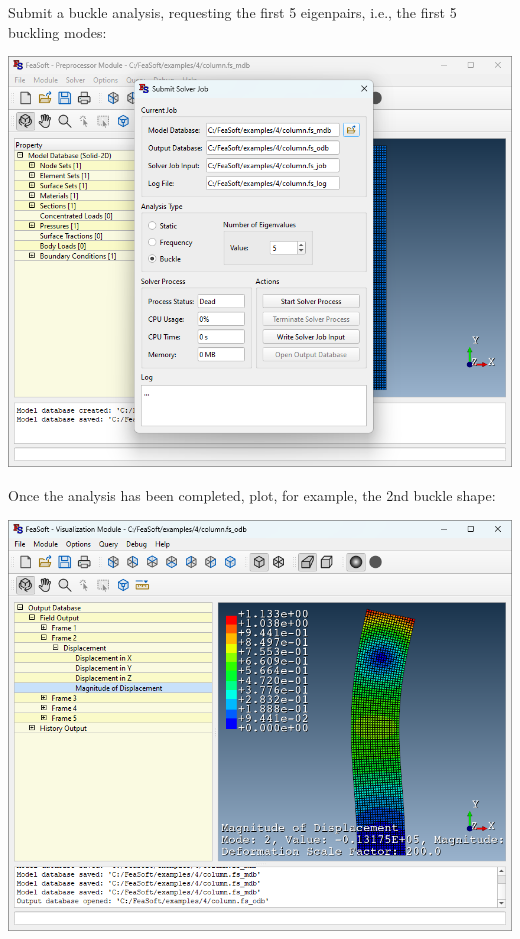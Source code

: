 \documentclass[
    11pt,        %
    a4paper,     %
    final,       %
    fleqn,       %
    notitlepage, %
    onecolumn,   %
    oneside,     %
]{article}
\begin{document}
Submit a buckle analysis, requesting the first 5 eigenpairs, i.e., the first 5 buckling modes:
\begin{center}
    \includegraphics[scale=0.5]{fig/ui-4-10.png}
\end{center}

Once the analysis has been completed, plot, for example, the 2nd buckle shape:
\begin{center}
    \includegraphics[scale=0.5]{fig/ui-4-11.png}
\end{center}
\end{document}

